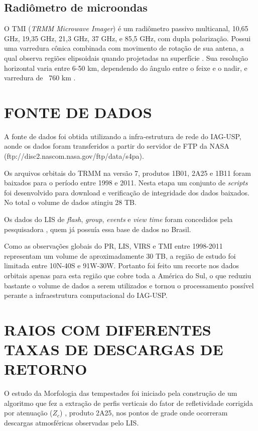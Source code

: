 \subsection{Radiômetro de microondas}

O TMI (\textit{TRMM Microwave Imager}) é um radiômetro passivo multicanal, 10,65 GHz, 19,35 GHz, 21,3 GHz, 37 GHz, e 85,5 GHz, com dupla polarização. Possui uma varredura cônica combinada com movimento de rotação de sua antena, a qual observa regiões elipsoidais quando projetadas na superfície \cite{kummerok1998}. Sua resolução horizontal varia entre 6-50 km, dependendo do ângulo entre o feixe e o nadir, e varredura de ~760 km \cite{trmmhandbook}. 

\section{FONTE DE DADOS}

A fonte de dados foi obtida utilizando a infra-estrutura de rede do IAG-USP, aonde os dados foram transferidos a partir do servidor de FTP da NASA (ftp://disc2.nascom.nasa.gov/ftp/data/s4pa). 

Os arquivos orbitais do TRMM na versão 7, produtos 1B01, 2A25 e 1B11 foram baixados para o período entre 1998 e 2011. Nesta etapa um conjunto de \textit{scripts} foi desenvolvido para download e verificação de integridade dos dados baixados. No total o volume de dados atingiu 28 TB.  %

Os dados do LIS de \textit{flash}, \textit{group}, \textit{events} e \textit{view time} foram concedidos pela pesquisadora , quem já possuía essa base de dados no Brasil. 

Como as observações globais do PR, LIS, VIRS e TMI entre 1998-2011 representam um volume de aproximadamente 30 TB, a região de estudo foi limitada entre 10N-40S e 91W-30W. Portanto foi feito um recorte nos dados orbitais apenas para esta região que cobre toda a América do Sul, o que reduziu bastante o volume de dados a serem utilizados e tornou o processamento possível perante a infraestrutura computacional do IAG-USP.

\section{RAIOS COM DIFERENTES TAXAS DE DESCARGAS DE RETORNO}

O estudo da Morfologia das tempestades foi iniciado pela construção de um algoritmo que fez a extração de perfis verticais do fator de refletividade corrigida por atenuação ($Z_c$) , produto 2A25, nos pontos de grade onde ocorreram descargas atmosféricas observadas pelo LIS.


